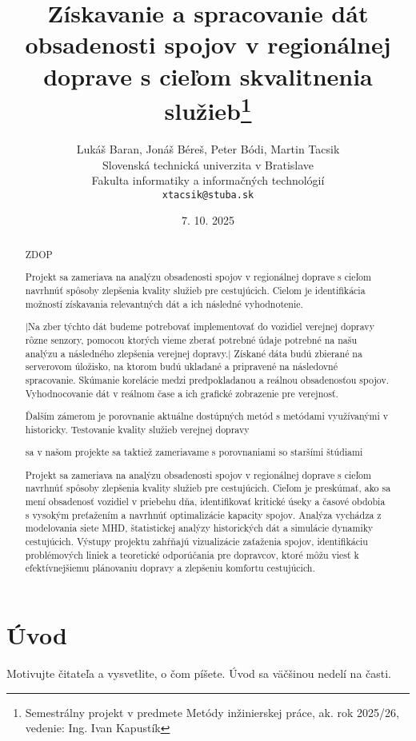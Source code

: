 \documentclass[10pt,twoside,slovak,a4paper]{article}
\title{Získavanie a spracovanie dát obsadenosti spojov v regionálnej doprave s cieľom skvalitnenia služieb\thanks{Semestrálny projekt v predmete Metódy inžinierskej práce, ak. rok 2025/26, vedenie: Ing. Ivan Kapustík}}
\author{Lukáš Baran,
Jonáš Béreš,
Peter Bódi,
Martin Tacsik\\[2pt]
	{\small Slovenská technická univerzita v Bratislave}\\
	{\small Fakulta informatiky a informačných technológií}\\
	{\small \texttt{xtacsik@stuba.sk}}
	}
\date{\small 7. 10. 2025}
\begin{document}
\maketitle



\begin{abstract}
ZDOP


Projekt sa zameriava na analýzu obsadenosti spojov v regionálnej doprave s cieľom navrhnúť spôsoby zlepšenia kvality služieb pre cestujúcich. Cielom je identifikácia možností získavania relevantných dát a ich následné vyhodnotenie. 


|Na zber týchto dát budeme potrebovať implementovať do vozidiel verejnej dopravy rôzne senzory, pomocou ktorých vieme zberať potrebné údaje potrebné na našu analýzu a následného zlepšenia verejnej dopravy.| Získané dáta budú zbierané na serverovom úložisko, na ktorom budú ukladané a pripravené na následovné spracovanie. Skúmanie korelácie medzi predpokladanou a reálnou obsadenosťou spojov. Vyhodnocovanie dát  v reálnom čase a ich grafické zobrazenie  pre verejnosť. 


Ďalším zámerom je porovnanie aktuálne dostúpných metód s metódami využívanými v historicky. Testovanie kvality služieb verejnej dopravy 

sa v našom projekte sa taktiež zameriavame s porovnaniami so staršími štúdiami 

Projekt sa zameriava na analýzu obsadenosti spojov v regionálnej doprave s cieľom navrhnúť spôsoby zlepšenia kvality služieb pre cestujúcich. Cieľom je preskúmať, ako sa mení obsadenosť vozidiel v priebehu dňa, identifikovať kritické úseky a časové obdobia s vysokým preťažením a navrhnúť optimalizácie kapacity spojov. Analýza vychádza z modelovania siete MHD, štatistickej analýzy historických dát a simulácie dynamiky cestujúcich. Výstupy projektu zahŕňajú vizualizácie zaťaženia spojov, identifikáciu problémových liniek a teoretické odporúčania pre dopravcov, ktoré môžu viesť k efektívnejšiemu plánovaniu dopravy a zlepšeniu komfortu cestujúcich.
\end{abstract}



\section{Úvod}

Motivujte čitateľa a vysvetlite, o čom píšete. Úvod sa väčšinou nedelí na časti.
\end{document}
